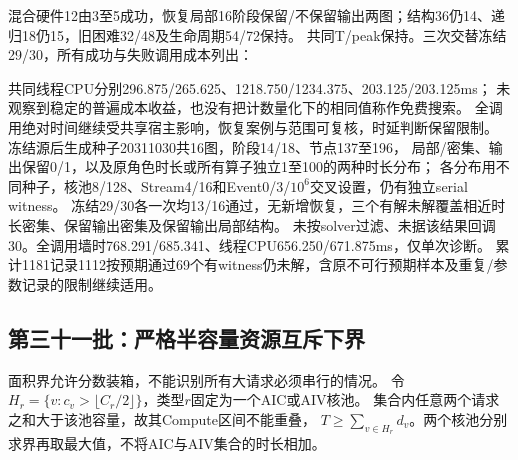\documentclass[UTF8,a4paper,11pt,fontset=fandol]{ctexart}
\begin{document}
混合硬件12由3至5成功，恢复局部16阶段保留/不保留输出两图；结构36仍14、递归18仍15，旧困难32/48及生命周期54/72保持。
共同T/peak保持。三次交替冻结29/30，所有成功与失败调用成本列出：
\par\smallskip{}\par\smallskip

共同线程CPU分别296.875/\allowbreak{}265.625、1218.750/\allowbreak{}1234.375、203.125/\allowbreak{}203.125ms；
未观察到稳定的普遍成本收益，也没有把计数量化下的相同值称作免费搜索。
全调用绝对时间继续受共享宿主影响，恢复案例与范围可复核，时延判断保留限制。
冻结源后生成种子20311030共16图，阶段14/18、节点137至196，
局部/密集、输出保留0/1，以及原角色时长或所有算子独立1至100的两种时长分布；
各分布用不同种子，核池8/128、Stream4/16和Event0/3/$10^6$交叉设置，仍有独立serial witness。
冻结29/30各一次均13/16通过，无新增恢复，三个有解未解覆盖相近时长密集、保留输出密集及保留输出局部结构。
未按solver过滤、未据该结果回调30。全调用墙时768.291/\allowbreak{}685.341、线程CPU656.250/\allowbreak{}671.875ms，仅单次诊断。
累计1181记录1112按预期通过69个有witness仍未解，含原不可行预期样本及重复/参数记录的限制继续适用。

\subsection{第三十一批：严格半容量资源互斥下界}
面积界允许分数装箱，不能识别所有大请求必须串行的情况。
令$H_r=\{v:c_v>\lfloor C_r/2\rfloor\}$，类型$r$固定为一个AIC或AIV核池。
集合内任意两个请求之和大于该池容量，故其Compute区间不能重叠，
$T\ge\sum_{v\in H_r}d_v$。两个核池分别求界再取最大值，不将AIC与AIV集合的时长相加。
\end{document}
